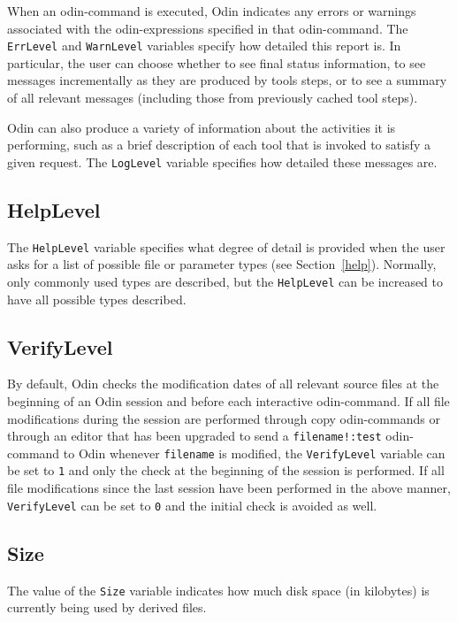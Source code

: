 \documentclass[hidelinks]{report}
\newcommand{\ex}{\tt}   %
\begin{document}
When an odin-command is executed, Odin indicates any errors or
warnings associated with the odin-expressions specified in that odin-command.
The {\ex ErrLevel} and {\ex WarnLevel} variables specify
how detailed this report is.
In particular, the user can choose whether
to see final status information,
to see messages incrementally as they are produced by tools steps,
or to see a summary of all relevant messages (including those from
previously cached tool steps).

Odin can also produce a variety of information about the activities
it is performing, such as a brief description of each tool that is
invoked to satisfy a given request.
The {\ex LogLevel} variable specifies how detailed these messages are.

\subsection{HelpLevel}
\label{helplevel}

The {\ex HelpLevel} variable specifies what degree of detail
is provided when the user asks for a list of possible
file or parameter types (see Section~\ref{help}).
Normally, only commonly used types are described, but the {\ex HelpLevel}
can be increased to have all possible types described.

\subsection{VerifyLevel}
\label{verifylevel}

By default, Odin checks the modification dates of all relevant source files
at the beginning of an Odin session and before each interactive odin-command.
If all file modifications during the session are performed through
copy odin-commands or through an editor that has been upgraded
to send a {\ex filename!:test} odin-command to Odin whenever {\ex filename}
is modified,
the {\ex VerifyLevel} variable can be set to {\ex 1} and only the check
at the beginning of the session is performed.
If all file modifications since the last session have been performed
in the above manner,
{\ex VerifyLevel} can be set to {\ex 0} and the initial check
is avoided as well.

\subsection{Size}

The value of the {\ex Size} variable indicates how much disk space
(in kilobytes) is currently being used by derived files.
\end{document}
